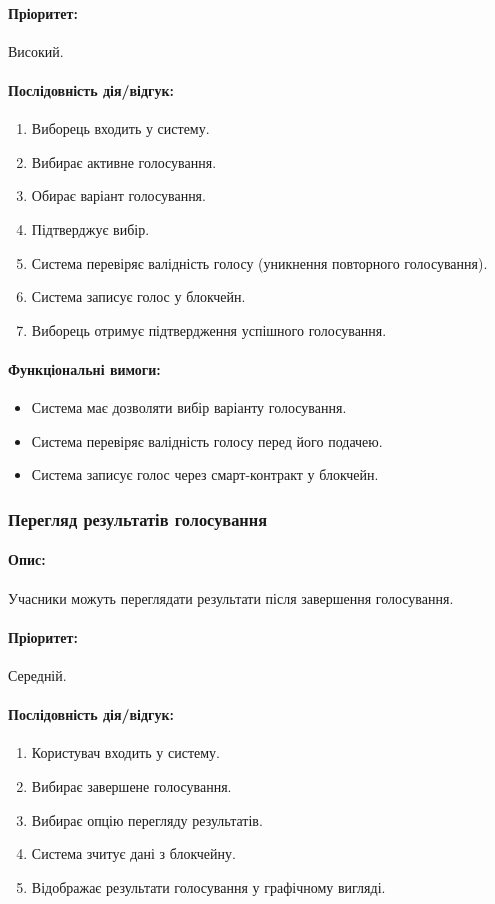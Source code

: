 \documentclass[14pt]{extreport}
\newcounter{req}[subsubsection]
\newcommand\req{\arabic{req}\stepcounter{req}}
\begin{document}
  \paragraph{Пріоритет:} Високий.  
  \paragraph{Послідовність дія/відгук:}  
  \begin{enumerate}  
      \item Виборець входить у систему.  
      \item Вибирає активне голосування.  
      \item Обирає варіант голосування.  
      \item Підтверджує вибір.  
      \item Система перевіряє валідність голосу (уникнення повторного голосування).  
      \item Система записує голос у блокчейн.  
      \item Виборець отримує підтвердження успішного голосування.  
  \end{enumerate}  
  \paragraph{Функціональні вимоги:}  
  \begin{itemize}[leftmargin=*,label=REQ-.\req:]  
      \item Система має дозволяти вибір варіанту голосування.  
      \item Система перевіряє валідність голосу перед його подачею.  
      \item Система записує голос через смарт-контракт у блокчейн.  
  \end{itemize}  

  \subsubsection{Перегляд результатів голосування}  
  \paragraph{Опис:} Учасники можуть переглядати результати після завершення голосування.  
  \paragraph{Пріоритет:} Середній.  
  \paragraph{Послідовність дія/відгук:}  
  \begin{enumerate}  
      \item Користувач входить у систему.  
      \item Вибирає завершене голосування.  
      \item Вибирає опцію перегляду результатів.  
      \item Система зчитує дані з блокчейну.  
      \item Відображає результати голосування у графічному вигляді.  
  \end{enumerate}  
\end{document}
